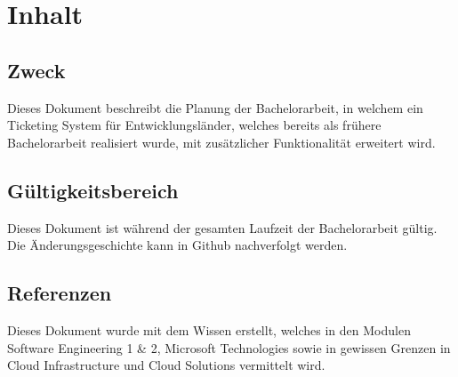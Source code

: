 \newpage
\section{Inhalt}
\subsection{Zweck}
Dieses Dokument beschreibt die Planung der Bachelorarbeit, in welchem ein Ticketing System für Entwicklungsländer, welches bereits als frühere Bachelorarbeit realisiert wurde, mit zusätzlicher Funktionalität erweitert wird.

\subsection{Gültigkeitsbereich}
Dieses Dokument ist während der gesamten Laufzeit der Bachelorarbeit gültig. Die Änderungsgeschichte kann in Github nachverfolgt werden.

\subsection{Referenzen}
Dieses Dokument wurde mit dem Wissen erstellt, welches in den Modulen Software Engineering 1 \& 2, Microsoft Technologies sowie in gewissen Grenzen in Cloud Infrastructure und Cloud Solutions vermittelt wird.


\newpage